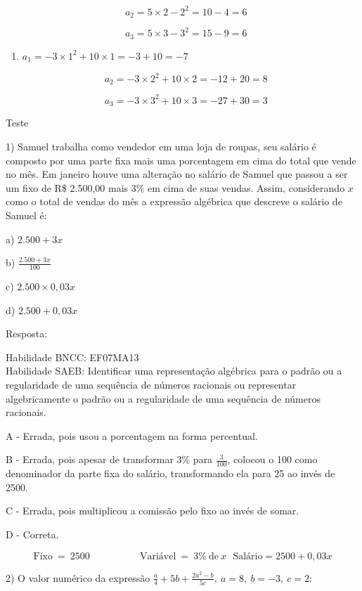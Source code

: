 \[\text{\ \ \ \ \ }a_{2} = 5 \times 2 - 2^2 = 10 - 4 = 6\]

\[{\text{\ \ \ \ \ }a}_{3} = 5 \times 3 - 3^2 = 15 - 9 = 6\]

\begin{enumerate}
\def\labelenumi{\alph{enumi})}
\setcounter{enumi}{3}
\tightlist
\item
  \(a_{1} = - 3 \times 1^{2} + 10 \times 1 = - 3 + 10 = - 7\)
\end{enumerate}

\[\text{\ \ \ \ \ }a_{2} = - 3 \times 2^{2} + 10 \times 2 = - 12 + 20 = 8\]

\[{\text{\ \ \ \ \ }a}_{3} = - 3 \times 3^{2} + 10 \times 3 = - 27 + 30 = 3\]

Teste

1) Samuel trabalha como vendedor em uma loja de roupas, seu salário é
composto por uma parte fixa mais uma porcentagem em cima do total que
vende no mês. Em janeiro houve uma alteração no salário de Samuel que
passou a ser um fixo de R\$ 2.500,00 mais 3\% em cima de suas vendas.
Assim, considerando \(x\) como o total de vendas do mês a expressão
algébrica que descreve o salário de Samuel é:

a) \(2.500 + 3x\)

b) \(\frac{2.500 + 3x}{100}\)

c) \(2.500 \times 0,03x\)

d) \(2.500 + 0,03x\)

Resposta:

Habilidade BNCC: EF07MA13\\
Habilidade SAEB: Identificar uma representação algébrica para o padrão
ou a regularidade de uma sequência de números racionais ou representar
algebricamente o padrão ou a regularidade de uma sequência de números
racionais.

A - Errada, pois usou a porcentagem na forma percentual.

B - Errada, pois apesar de transformar 3\% para \(\frac{3}{100}\),
colocou o 100 como denominador da parte fixa do salário, transformando
ela para 25 ao invés de 2500.

C - Errada, pois multiplicou a comissão pelo fixo ao invés de somar.

D - Correta.

\[\text{Fixo}\  = \ 2500\ \ \ \ \ \ \ \ \ \ \ \ \ \ \ \ \ \ \ \ \ \ \ \text{Vari}á\text{vel}\  = \ 3\%\ \text{de}\ x\text{\ \ \ \ \ \ \ \ \ \ \ \ \ \ \ \ \ }\text{Sal}á\text{rio} = 2500 + 0,03x\]

2) O valor numérico da expressão
\(\frac{a}{4} + 5b + \frac{2a^{2} - b}{5c},\ a = 8,\ b = - 3,\ c = 2\):

